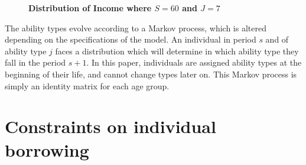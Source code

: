 \documentclass[letterpaper,12pt]{article}
\theoremstyle{definition}
\begin{document}
    \begin{figure}[htb]\centering \captionsetup{width=4.0in}
      \caption{\label{FigIncome}\textbf{Distribution of Income where $S=60$ and $J=7$}}
    \end{figure}

  The ability types evolve according to a Markov process, which is altered depending on the specifications of the model.  An individual in period $s$ and of ability type $j$ faces a distribution which will determine in which ability type they fall in the period $s+1$.  In this paper, individuals are assigned ability types at the beginning of their life, and cannot change types later on.  This Markov process is simply an identity matrix for each age group.



\newpage
\section{Constraints on individual borrowing}\label{AppBorConstr}

  \setcounter{equation}{0}
\end{document}
